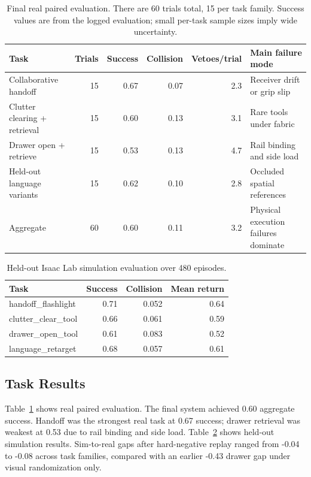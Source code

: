 \documentclass[10pt,twocolumn]{article}
\begin{document}
\begin{table}[t]
\centering
\caption{Final real paired evaluation. There are 60 trials total, 15 per task family. Success values are from the logged evaluation; small per-task sample sizes imply wide uncertainty.}
\label{tab:real}
\begin{tabular}{lrrrrl}
\toprule
Task & Trials & Success & Collision & Vetoes/trial & Main failure mode \\
\midrule
Collaborative handoff & 15 & 0.67 & 0.07 & 2.3 & Receiver drift or grip slip \\
Clutter clearing + retrieval & 15 & 0.60 & 0.13 & 3.1 & Rare tools under fabric \\
Drawer open + retrieve & 15 & 0.53 & 0.13 & 4.7 & Rail binding and side load \\
Held-out language variants & 15 & 0.62 & 0.10 & 2.8 & Occluded spatial references \\
\midrule
Aggregate & 60 & 0.60 & 0.11 & 3.2 & Physical execution failures dominate \\
\bottomrule
\end{tabular}
\end{table}

\begin{table}[t]
\centering
\caption{Held-out Isaac Lab simulation evaluation over 480 episodes.}
\label{tab:sim}
\begin{tabular}{lrrr}
\toprule
Task & Success & Collision & Mean return \\
\midrule
handoff\_flashlight & 0.71 & 0.052 & 0.64 \\
clutter\_clear\_tool & 0.66 & 0.061 & 0.59 \\
drawer\_open\_tool & 0.61 & 0.083 & 0.52 \\
language\_retarget & 0.68 & 0.057 & 0.61 \\
\bottomrule
\end{tabular}
\end{table}

\subsection{Task Results}

Table~\ref{tab:real} shows real paired evaluation. The final system achieved 0.60 aggregate success. Handoff was the strongest real task at 0.67 success; drawer retrieval was weakest at 0.53 due to rail binding and side load. Table~\ref{tab:sim} shows held-out simulation results. Sim-to-real gaps after hard-negative replay ranged from -0.04 to -0.08 across task families, compared with an earlier -0.43 drawer gap under visual randomization only.
\end{document}
